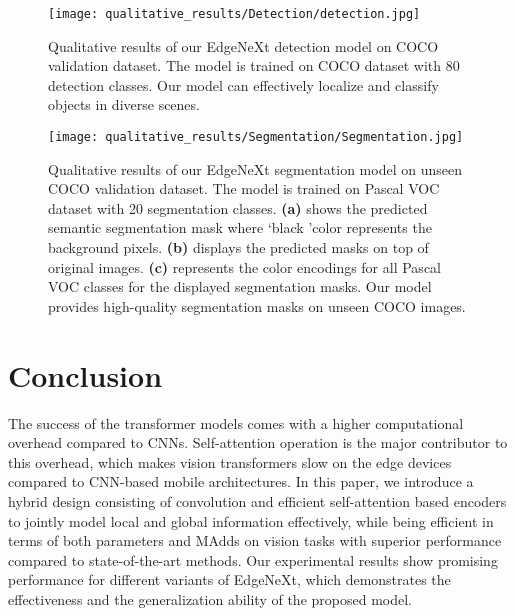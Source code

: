 \documentclass[runningheads]{llncs}
\begin{document}
\begin{figure}[!ht]
    \centering
    \texttt{[image: qualitative\_results/Detection/detection.jpg]}
    \caption{\small Qualitative results of our EdgeNeXt detection model on COCO validation dataset. The model is trained on COCO dataset with 80 detection classes. Our model can effectively localize and classify objects in diverse scenes.}
    \label{qualitative_detection}
\end{figure} 

\begin{figure}[!ht]
    \centering
    \texttt{[image: qualitative\_results/Segmentation/Segmentation.jpg]}
    \caption{Qualitative results of our EdgeNeXt segmentation model on unseen COCO validation dataset. The model is trained on Pascal VOC dataset with 20 segmentation classes. {\color{blue}\textbf{(a)}} shows the predicted semantic segmentation mask where \lq black \rq color represents the background pixels. {\color{blue}\textbf{(b)}} displays the predicted masks on top of original images. {\color{blue}\textbf{(c)}} represents the color encodings for all Pascal VOC classes for the displayed segmentation masks. Our model provides high-quality segmentation masks on unseen COCO images.
    }
    \label{qualitative_segmentation}
\end{figure}


\section{Conclusion}
The success of the transformer models comes with a higher computational overhead compared to CNNs. Self-attention operation is the major contributor to this overhead, which makes vision transformers slow on the edge devices compared to CNN-based mobile architectures. In this paper, we introduce a hybrid design consisting of convolution and efficient self-attention based encoders to jointly model local and global information effectively, while being efficient in terms of both parameters and MAdds on vision tasks with superior performance compared to state-of-the-art methods. Our experimental results show promising performance for different variants of EdgeNeXt, which demonstrates the effectiveness and the generalization ability of the proposed model.

\clearpage


\end{document}
